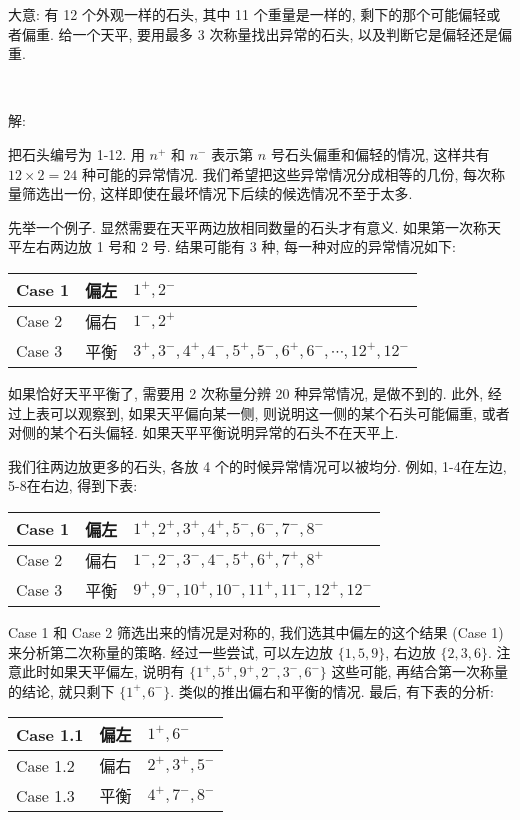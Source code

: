 大意: 有 12 个外观一样的石头, 其中 11 个重量是一样的, 剩下的那个可能偏轻或者偏重. 给一个天平, 要用最多 3 次称量找出异常的石头, 以及判断它是偏轻还是偏重. 

~ 

\noindent 解:

把石头编号为 1-12. 用 $ n^+ $ 和 $ n^- $ 表示第 $ n $ 号石头偏重和偏轻的情况, 这样共有 $ 12\times 2 = 24 $ 种可能的异常情况. 我们希望把这些异常情况分成相等的几份, 每次称量筛选出一份, 这样即使在最坏情况下后续的候选情况不至于太多. 

先举一个例子. 显然需要在天平两边放相同数量的石头才有意义. 如果第一次称天平左右两边放 1 号和 2 号. 结果可能有 3 种, 每一种对应的异常情况如下:
\begin{figure*}[htbp]
\centering
\setlength\extrarowheight{2pt}
\begin{tabular}{l|l|l}
\hline
Case 1 & 偏左  & $1^+, 2^-$ \\ \hline
Case 2 & 偏右  & $1^-, 2^+$ \\ \hline
Case 3 & 平衡  & $3^+, 3^-, 4^+, 4^-, 5^+, 5^-, 6^+, 6^-, \cdots, 12^+, 12^- $ \\ \hline
\end{tabular}
\end{figure*}

如果恰好天平平衡了, 需要用 2 次称量分辨 20 种异常情况, 是做不到的. 此外, 经过上表可以观察到, 如果天平偏向某一侧, 则说明这一侧的某个石头可能偏重, 或者对侧的某个石头偏轻. 如果天平平衡说明异常的石头不在天平上. 

我们往两边放更多的石头, 各放 4 个的时候异常情况可以被均分. 例如, 1-4在左边, 5-8在右边, 得到下表:
\begin{figure*}[htbp]
\centering
\setlength\extrarowheight{2pt}
\begin{tabular}{l|l|l}
\hline
Case 1 & 偏左  & $1^+, 2^+, 3^+, 4^+, 5^-, 6^-, 7^-, 8^- $ \\ \hline
Case 2 & 偏右  & $1^-, 2^-, 3^-, 4^-, 5^+, 6^+, 7^+, 8^+ $ \\ \hline
Case 3 & 平衡  & $9^+, 9^-, 10^+, 10^-, 11^+, 11^-, 12^+, 12^- $ \\ \hline
\end{tabular}
\end{figure*}

Case 1 和 Case 2 筛选出来的情况是对称的, 我们选其中偏左的这个结果 (Case 1) 来分析第二次称量的策略. 经过一些尝试, 可以左边放 $\{1,5,9\}$, 右边放 $\{2,3,6\}$. 注意此时如果天平偏左, 说明有 $ \{ 1^+, 5^+, 9^+, 2^-, 3^-, 6^- \}$ 这些可能, 再结合第一次称量的结论, 就只剩下 $ \{1^+, 6^- \} $. 类似的推出偏右和平衡的情况. 最后, 有下表的分析:
\begin{figure*}[htbp]
\centering
\setlength\extrarowheight{2pt}
\begin{tabular}{l|l|l}
\hline
Case 1.1 & 偏左  & $1^+, 6^-$ \\ \hline
Case 1.2 & 偏右  & $2^+, 3^+, 5^- $ \\ \hline
Case 1.3 & 平衡  & $4^+, 7^-, 8^- $ \\ \hline
\end{tabular}
\end{figure*}

